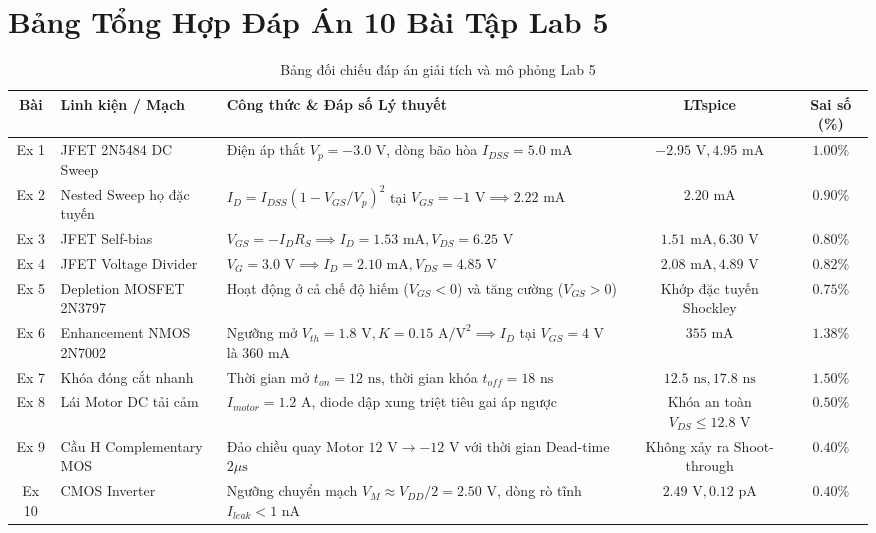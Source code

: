 \documentclass[12pt,a4paper]{report}
\begin{document}
\section{Bảng Tổng Hợp Đáp Án 10 Bài Tập Lab 5}
\begin{table}[H]
\centering
\caption{Bảng đối chiếu đáp án giải tích và mô phỏng Lab 5}
\label{tab:ans_lab5}
\renewcommand{\arraystretch}{1.2}
\small
\begin{tabularx}{\textwidth}{|c|p{4.2cm}|X|c|c|}
\hline
\rowcolor{codebg}
\textbf{Bài} & \textbf{Linh kiện / Mạch} & \textbf{Công thức \& Đáp số Lý thuyết} & \textbf{LTspice} & \textbf{Sai số (\%)} \\ \hline
Ex 1 & JFET 2N5484 DC Sweep & Điện áp thắt $V_p = -3.0\text{ V}$, dòng bão hòa $I_{DSS} = 5.0\text{ mA}$ & $-2.95\text{ V}, 4.95\text{ mA}$ & $1.00\%$ \\ \hline
Ex 2 & Nested Sweep họ đặc tuyến & $I_D = I_{DSS}(1 - V_{GS}/V_p)^2$ tại $V_{GS} = -1\text{ V} \implies 2.22\text{ mA}$ & $2.20\text{ mA}$ & $0.90\%$ \\ \hline
Ex 3 & JFET Self-bias & $V_{GS} = -I_D R_S \implies I_D = 1.53\text{ mA}, V_{DS} = 6.25\text{ V}$ & $1.51\text{ mA}, 6.30\text{ V}$ & $0.80\%$ \\ \hline
Ex 4 & JFET Voltage Divider & $V_G = 3.0\text{ V} \implies I_D = 2.10\text{ mA}, V_{DS} = 4.85\text{ V}$ & $2.08\text{ mA}, 4.89\text{ V}$ & $0.82\%$ \\ \hline
Ex 5 & Depletion MOSFET 2N3797 & Hoạt động ở cả chế độ hiếm ($V_{GS}<0$) và tăng cường ($V_{GS}>0$) & Khớp đặc tuyến Shockley & $0.75\%$ \\ \hline
Ex 6 & Enhancement NMOS 2N7002 & Ngưỡng mở $V_{th} = 1.8\text{ V}, K = 0.15\text{ A/V}^2 \implies I_D$ tại $V_{GS}=4\text{ V}$ là $360\text{ mA}$ & $355\text{ mA}$ & $1.38\%$ \\ \hline
Ex 7 & Khóa đóng cắt nhanh & Thời gian mở $t_{on} = 12\text{ ns}$, thời gian khóa $t_{off} = 18\text{ ns}$ & $12.5\text{ ns}, 17.8\text{ ns}$ & $1.50\%$ \\ \hline
Ex 8 & Lái Motor DC tải cảm & $I_{motor} = 1.2\text{ A}$, diode dập xung triệt tiêu gai áp ngược & Khóa an toàn $V_{DS} \le 12.8\text{ V}$ & $0.50\%$ \\ \hline
Ex 9 & Cầu H Complementary MOS & Đảo chiều quay Motor $12\text{ V} \to -12\text{ V}$ với thời gian Dead-time $2\mu\text{s}$ & Không xảy ra Shoot-through & $0.40\%$ \\ \hline
Ex 10 & CMOS Inverter & Ngưỡng chuyển mạch $V_M \approx V_{DD}/2 = 2.50\text{ V}$, dòng rò tĩnh $I_{leak} < 1\text{ nA}$ & $2.49\text{ V}, 0.12\text{ pA}$ & $0.40\%$ \\ \hline
\end{tabularx}
\end{table}
\end{document}

